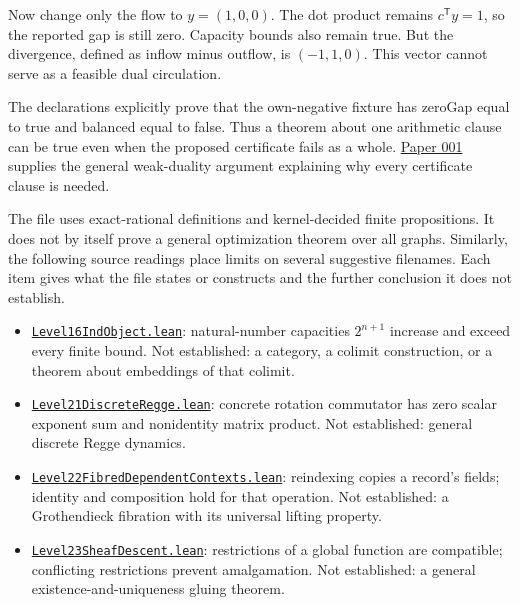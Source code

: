 \documentclass[
  11pt,
]{article}
\providecommand{\tightlist}{%
  \setlength{\itemsep}{0pt}\setlength{\parskip}{0pt}}
\begin{document}
Now change only the flow to \(y=(1,0,0)\). The dot product remains
\(c^\mathsf{T}y=1\), so the reported gap is still zero. Capacity bounds
also remain true. But the divergence, defined as inflow minus outflow,
is \((-1,1,0)\). This vector cannot serve as a feasible dual
circulation.

The declarations explicitly prove that the own-negative fixture has
zeroGap equal to true and balanced equal to false. Thus a theorem about
one arithmetic clause can be true even when the proposed certificate
fails as a whole.
\href{https://github.com/dbccpage/the_symbol_game/blob/23893fc44162555fa12ceda3e1665982e3d7a14e/atlas/coda_atlas/symbol_game/001_pfp_discrete_cochain_retraction_and_toy_involutions/paper.md}{Paper
001} supplies the general weak-duality argument explaining why every
certificate clause is needed.

The file uses exact-rational definitions and kernel-decided finite
propositions. It does not by itself prove a general optimization theorem
over all graphs. Similarly, the following source readings place limits
on several suggestive filenames. Each item gives what the file states or
constructs and the further conclusion it does not establish.

\begin{itemize}
\tightlist
\item
  \href{https://github.com/dbccpage/the_symbol_game/blob/52cb5457f6c485ba548cfd292f6012a941ed22cf/lean4/Level16IndObject.lean}{\mbox{\nolinkurl{Level16IndObject.lean}}}:
  natural-number capacities \(2^{n+1}\) increase and exceed every finite
  bound. Not established: a category, a colimit construction, or a
  theorem about embeddings of that colimit.
\item
  \href{https://github.com/dbccpage/the_symbol_game/blob/52cb5457f6c485ba548cfd292f6012a941ed22cf/lean4/Level21DiscreteRegge.lean}{\mbox{\nolinkurl{Level21DiscreteRegge.lean}}}:
  concrete rotation commutator has zero scalar exponent sum and
  nonidentity matrix product. Not established: general discrete Regge
  dynamics.
\item
  \href{https://github.com/dbccpage/the_symbol_game/blob/52cb5457f6c485ba548cfd292f6012a941ed22cf/lean4/Level22FibredDependentContexts.lean}{\mbox{\nolinkurl{Level22FibredDependentContexts.lean}}}:
  reindexing copies a record's fields; identity and composition hold for
  that operation. Not established: a Grothendieck fibration with its
  universal lifting property.
\item
  \href{https://github.com/dbccpage/the_symbol_game/blob/52cb5457f6c485ba548cfd292f6012a941ed22cf/lean4/Level23SheafDescent.lean}{\mbox{\nolinkurl{Level23SheafDescent.lean}}}:
  restrictions of a global function are compatible; conflicting
  restrictions prevent amalgamation. Not established: a general
  existence-and-uniqueness gluing theorem.
\end{itemize}
\end{document}
